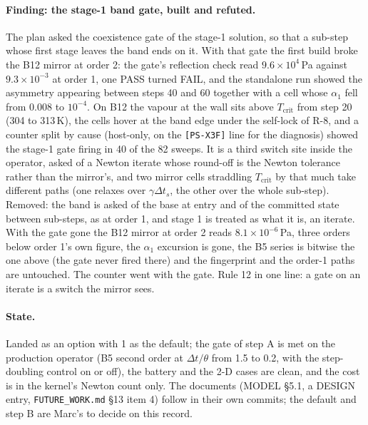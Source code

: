 \documentclass[11pt,a4paper]{article}
\newcommand{\code}[1]{\texttt{\small #1}}
\newcommand{\Dt}{\Delta t}
\begin{document}
\paragraph{Finding: the stage-1 band gate, built and refuted.}  The
plan asked the coexistence gate of the stage-1 solution, so that a
sub-step whose first stage leaves the band ends on it.  With that gate
the first build broke the B12 mirror at order 2: the gate's reflection
check read $9.6\times10^{4}$\,Pa against $9.3\times10^{-3}$ at order 1,
one PASS turned FAIL, and the standalone run showed the asymmetry
appearing between steps 40 and 60 together with a cell whose
$\alpha_1$ fell from 0.008 to $10^{-4}$.  On B12 the vapour at the wall
sits above $T_{\mathrm{crit}}$ from step 20 (304 to 313\,K), the
cells hover at the band edge under the self-lock of R-8, and a counter
split by cause (host-only, on the \code{[PS-X3F]} line for the
diagnosis) showed the stage-1 gate firing in 40 of the 82 sweeps.  It
is a third switch site inside the operator, asked of a Newton iterate
whose round-off is the Newton tolerance rather than the mirror's, and
two mirror cells straddling $T_{\mathrm{crit}}$ by that much take
different paths (one relaxes over $\gamma\Dt_s$, the other over the
whole sub-step).  Removed: the band is asked of the base at entry and
of the committed state between sub-steps, as at order 1, and stage 1
is treated as what it is, an iterate.  With the gate gone the B12
mirror at order 2 reads $8.1\times10^{-6}$\,Pa, three orders below
order 1's own figure, the $\alpha_1$ excursion is gone, the B5 series
is bitwise the one above (the gate never fired there) and the
fingerprint and the order-1 paths are untouched.  The counter went
with the gate.  Rule 12 in one line: a gate on an iterate is a switch
the mirror sees.

\paragraph{State.}  Landed as an option with 1 as the default; the gate
of step A is met on the production operator (B5 second order at
$\Dt/\theta$ from 1.5 to 0.2, with the step-doubling control on or
off), the battery and the 2-D cases are clean, and the cost is in the
kernel's Newton count only.  The documents (MODEL \S5.1, a DESIGN
entry, \code{FUTURE\_WORK.md} \S13 item 4) follow in their own
commits; the default and step B are Marc's to decide on this record.
\end{document}
